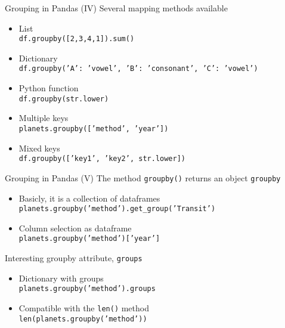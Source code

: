 \documentclass[10pt,compress]{beamer} %
\begin{document}
\begin{frame}{Grouping in Pandas (IV)}
	Several mapping methods available
	\begin{itemize}
		\item List\\
			  \texttt{df.groupby([2,3,4,1]).sum()}
		\item Dictionary \\
			  \texttt{df.groupby({'A': 'vowel', 'B': 'consonant', 'C': 'vowel'})}
		\item Python function \\
			  \texttt{df.groupby(str.lower)}
		\item Multiple keys \\
		      \texttt{planets.groupby(['method', 'year'])}
		\item Mixed keys \\
		      \texttt{df.groupby(['key1', 'key2', str.lower])}
	\end{itemize}
\end{frame}

\begin{frame}{Grouping in Pandas (V)}
	The method \texttt{groupby()} returns an object \texttt{groupby}
	\begin{itemize}
		\item Basicly, it is a collection of dataframes\\
		      \texttt{planets.groupby('method').get\_group('Transit')}
		\item Column selection as dataframe\\
		      \texttt{planets.groupby('method')['year']}
	\end{itemize}
	Interesting groupby attribute, \texttt{groups}
	\begin{itemize}
		\item Dictionary with groups\\
		      \texttt{planets.groupby('method').groups}
		\item Compatible with the \texttt{len()} method\\
		      \texttt{len(planets.groupby('method'))}
	\end{itemize}
\end{frame}
\end{document}
